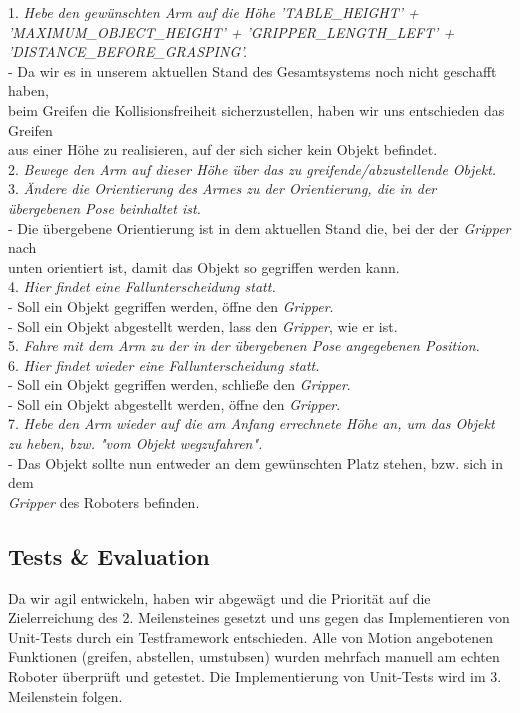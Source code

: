 \documentclass{suturo}
\begin{document}
1. \textit{Hebe den gewünschten Arm auf die Höhe 'TABLE\_HEIGHT' + 'MAXIMUM\_OBJECT\_HEIGHT' + 'GRIPPER\_LENGTH\_LEFT' + 'DISTANCE\_BEFORE\_GRASPING'.}\\
\tab - Da wir es in unserem aktuellen Stand des Gesamtsystems noch nicht geschafft haben, \\ \tab beim Greifen die Kollisionsfreiheit sicherzustellen, haben wir uns entschieden das Greifen\\ \tab aus einer Höhe zu realisieren, auf der sich sicher kein Objekt befindet.\\

2. \textit{Bewege den Arm auf dieser Höhe über das zu greifende/abzustellende Objekt.}\\

3. \textit{Ändere die Orientierung des Armes zu der Orientierung, die in der übergebenen Pose beinhaltet ist.}\\
\tab - Die übergebene Orientierung ist in dem aktuellen Stand die, bei der der \textit{Gripper} nach \\ \tab unten orientiert ist, damit das Objekt so gegriffen werden kann.\\

4. \textit{Hier findet eine Fallunterscheidung statt.}\\
\tab - Soll ein Objekt gegriffen werden, öffne den \textit{Gripper}.\\
\tab - Soll ein Objekt abgestellt werden, lass den \textit{Gripper}, wie er ist.\\

5. \textit{Fahre mit dem Arm zu der in der übergebenen Pose angegebenen Position.}\\

6. \textit{Hier findet wieder eine Fallunterscheidung statt.}\\
\tab - Soll ein Objekt gegriffen werden, schließe den \textit{Gripper}.\\
\tab - Soll ein Objekt abgestellt werden, öffne den \textit{Gripper}.\\

7. \textit{Hebe den Arm wieder auf die am Anfang errechnete Höhe an, um das Objekt zu heben, bzw. "vom Objekt wegzufahren".}\\
\tab - Das Objekt sollte nun entweder an dem gewünschten Platz stehen, bzw. sich in dem\\ \tab \textit{Gripper} des Roboters befinden.


\subsection{Tests \& Evaluation}
Da wir agil entwickeln, haben wir abgewägt und die Priorität auf die Zielerreichung des 2.
Meilensteines gesetzt und uns gegen das Implementieren von Unit-Tests durch ein Testframework entschieden. Alle von Motion angebotenen Funktionen (greifen, abstellen, umstubsen) wurden mehrfach manuell am echten Roboter überprüft und getestet. Die Implementierung von Unit-Tests wird im 3. Meilenstein folgen. \\
\end{document}
